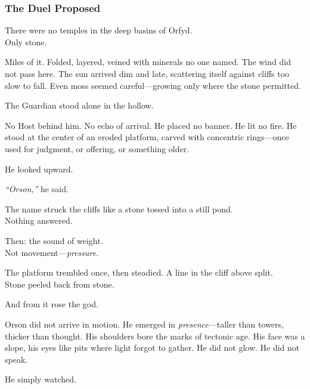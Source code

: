 \documentclass[12pt]{article}
\begin{document}
\dotfill

\subsubsection*{The Duel Proposed}

There were no temples in the deep basins of Orfyd.\\
Only stone.

\vspace{0.5em}
Miles of it. Folded, layered, veined with minerals no one named. The wind did not pass here. The sun arrived dim and late, scattering itself against cliffs too slow to fall. Even moss seemed careful---growing only where the stone permitted.

\vspace{0.5em}
The Guardian stood alone in the hollow.

\vspace{0.5em}
No Host behind him. No echo of arrival. He placed no banner. He lit no fire. He stood at the center of an eroded platform, carved with concentric rings---once used for judgment, or offering, or something older.

\vspace{0.5em}
He looked upward.

\vspace{0.5em}
\textit{``Orson,''} he said.

\vspace{0.5em}
The name struck the cliffs like a stone tossed into a still pond.\\
Nothing answered.

\vspace{0.5em}
Then: the sound of weight.\\
Not movement---\textit{pressure}.

\vspace{0.5em}
The platform trembled once, then steadied. A line in the cliff above split.\\
Stone peeled back from stone.

\vspace{0.5em}
And from it rose the god.

\vspace{0.5em}
Orson did not arrive in motion. He emerged in \textit{presence}---taller than towers, thicker than thought. His shoulders bore the marks of tectonic age. His face was a slope, his eyes like pits where light forgot to gather. He did not glow. He did not speak.

\vspace{0.5em}
He simply watched.
\end{document}
